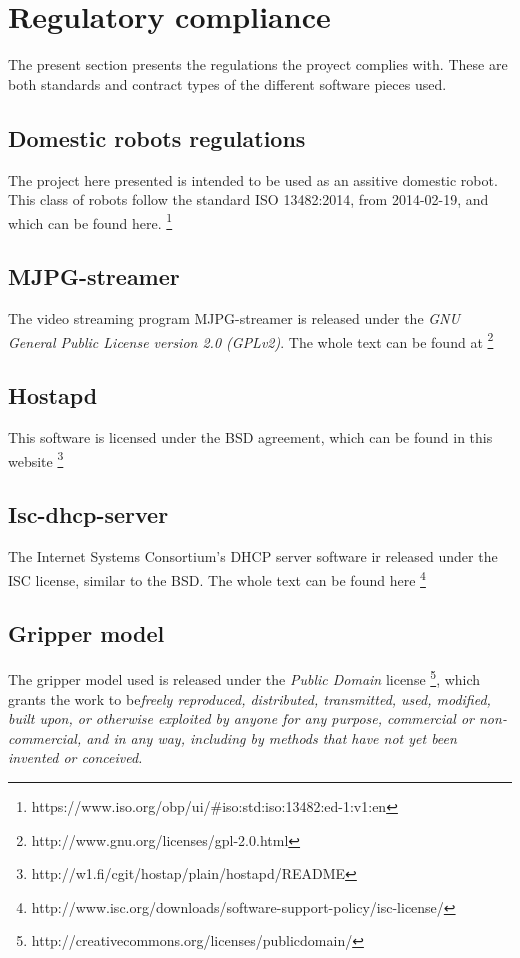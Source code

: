 \section{Regulatory compliance}

The present section presents the regulations the proyect complies with. These are both standards and contract types of the different software pieces used.

	\subsection{Domestic robots regulations} The project here presented is intended to be used as an assitive domestic robot. This class of robots follow the standard ISO 13482:2014, from 2014-02-19, and which can be found here. \footnote{https://www.iso.org/obp/ui/\#iso:std:iso:13482:ed-1:v1:en}

	\subsection{MJPG-streamer} The video streaming program MJPG-streamer is released under the \textit{GNU General Public License version 2.0 (GPLv2)}. The whole text can be found at \footnote{http://www.gnu.org/licenses/gpl-2.0.html}

	\subsection{Hostapd} This software is licensed under the BSD agreement, which can be found in this website \footnote{http://w1.fi/cgit/hostap/plain/hostapd/README}

	\subsection{Isc-dhcp-server} The Internet Systems Consortium's DHCP server software ir released under the ISC license, similar to the BSD. The whole text can be found here \footnote{http://www.isc.org/downloads/software-support-policy/isc-license/}

	\subsection{Gripper model} The gripper model  used is released under the \textit{Public Domain} license \footnote{http://creativecommons.org/licenses/publicdomain/}, which grants the work to be\textit{freely reproduced, distributed, transmitted, used, modified, built upon, or otherwise exploited by anyone for any purpose, commercial or non-commercial, and in any way, including by methods that have not yet been invented or conceived.}

